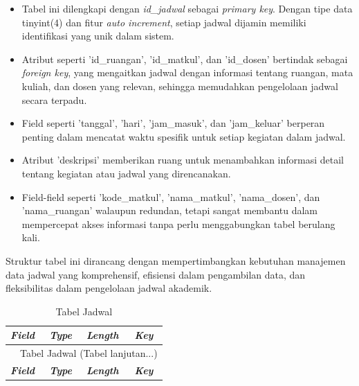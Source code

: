 \begin{enumerate}
	      \begin{itemize}
		      \item Tabel ini dilengkapi dengan \textit{id\_jadwal} sebagai \textit{primary key}. Dengan tipe data tinyint(4) dan fitur \textit{auto increment}, setiap jadwal dijamin memiliki identifikasi yang unik dalam sistem.
		      \item Atribut seperti 'id\_ruangan', 'id\_matkul', dan 'id\_dosen' bertindak sebagai \textit{foreign key}, yang mengaitkan jadwal dengan informasi tentang ruangan, mata kuliah, dan dosen yang relevan, sehingga memudahkan pengelolaan jadwal secara terpadu.
		      \item Field seperti 'tanggal', 'hari', 'jam\_masuk', dan 'jam\_keluar' berperan penting dalam mencatat waktu spesifik untuk setiap kegiatan dalam jadwal.
		      \item Atribut 'deskripsi' memberikan ruang untuk menambahkan informasi detail tentang kegiatan atau jadwal yang direncanakan.
		      \item Field-field seperti 'kode\_matkul', 'nama\_matkul', 'nama\_dosen', dan 'nama\_ruangan' walaupun redundan, tetapi sangat membantu dalam mempercepat akses informasi tanpa perlu menggabungkan tabel berulang kali.
	      \end{itemize}

	      Struktur tabel ini dirancang dengan mempertimbangkan kebutuhan manajemen data jadwal yang komprehensif, efisiensi dalam pengambilan data, dan fleksibilitas dalam pengelolaan jadwal akademik.

		      {
			      \fontsize{10}{12}\selectfont
			      \begin{longtable}{l l l l}
				      \caption{Tabel Jadwal}
				      \label{admin}                                                                                       \\
				      \hline
				      \textbf{\textit{Field}} & \textbf{\textit{Type}} & \textbf{\textit{Length}} & \textbf{\textit{Key}} \\
				      \hline
				      \endfirsthead

				      \multicolumn{4}{c}{\tablename\ \thetable\ {Tabel Jadwal} \space (Tabel lanjutan...)}                \\
				      \hline
				      \textbf{\textit{Field}} & \textbf{\textit{Type}} & \textbf{\textit{Length}} & \textbf{\textit{Key}} \\
				      \hline
				      \endhead


\end{longtable}}
\end{enumerate}
